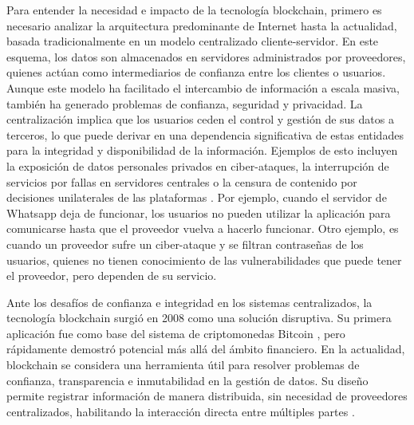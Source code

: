 Para entender la necesidad e impacto de la tecnología blockchain, primero es necesario analizar la arquitectura predominante de Internet hasta la actualidad, basada tradicionalmente en un modelo centralizado cliente-servidor. En este esquema, los datos son almacenados en servidores administrados por proveedores, quienes actúan como intermediarios de confianza entre los clientes o usuarios. Aunque este modelo ha facilitado el intercambio de información a escala masiva, también ha generado problemas de confianza, seguridad y privacidad. La centralización implica que los usuarios ceden el control y gestión de sus datos a terceros, lo que puede derivar en una dependencia significativa de estas entidades para la integridad y disponibilidad de la información. Ejemplos de esto incluyen la exposición de datos personales privados en ciber-ataques, la interrupción de servicios por fallas en servidores centrales o la censura de contenido por decisiones unilaterales de las plataformas \cite{pending}. Por ejemplo, cuando el servidor de Whatsapp deja de funcionar, los usuarios no pueden utilizar la aplicación para comunicarse hasta que el proveedor vuelva a hacerlo funcionar. Otro ejemplo, es cuando un proveedor sufre un ciber-ataque y se filtran contraseñas de los usuarios, quienes no tienen conocimiento de las vulnerabilidades que puede tener el proveedor, pero dependen de su servicio.

Ante los desafíos de confianza e integridad en los sistemas centralizados, la tecnología blockchain surgió en 2008 como una solución disruptiva. Su primera aplicación fue como base del sistema de criptomonedas Bitcoin \cite{satoshi2008bitcoin}, pero rápidamente demostró potencial más allá del ámbito financiero. En la actualidad, blockchain se considera una herramienta útil para resolver problemas de confianza, transparencia e inmutabilidad en la gestión de datos. Su diseño permite registrar información de manera distribuida, sin necesidad de proveedores centralizados, habilitando la interacción directa entre múltiples partes \cite{bulkowska2023implementation}.


